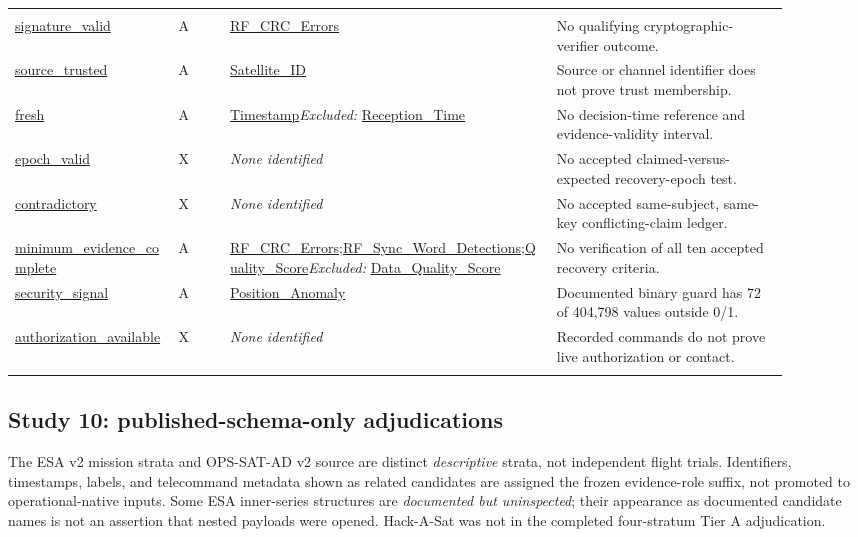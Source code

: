 \begin{longtable}{@{}>{\raggedright\arraybackslash}p{0.19\linewidth}>{\raggedright\arraybackslash}p{0.06\linewidth}>{\raggedright\arraybackslash}p{0.38\linewidth}>{\raggedright\arraybackslash}p{0.27\linewidth}@{}}
\addlinespace[3pt]
\multicolumn{4}{@{}l}{\textbf{UNSW-IoTSAT 2026}}\\
\url{signature_valid} & A & \url{RF_CRC_Errors} & No qualifying cryptographic-verifier outcome. \\
\url{source_trusted} & A & \url{Satellite_ID} & Source or channel identifier does not prove trust membership. \\
\url{fresh} & A & \url{Timestamp}\newline \emph{Excluded:} \url{Reception_Time} & No decision-time reference and evidence-validity interval. \\
\url{epoch_valid} & X & \emph{None identified} & No accepted claimed-versus-expected recovery-epoch test. \\
\url{contradictory} & X & \emph{None identified} & No accepted same-subject, same-key conflicting-claim ledger. \\
\url{minimum_evidence_complete} & A & \url{RF_CRC_Errors};\allowbreak \url{RF_Sync_Word_Detections};\allowbreak \url{Quality_Score}\newline \emph{Excluded:} \url{Data_Quality_Score} & No verification of all ten accepted recovery criteria. \\
\url{security_signal} & A & \url{Position_Anomaly} & Documented binary guard has 72 of 404,798 values outside 0/1. \\
\url{authorization_available} & X & \emph{None identified} & Recorded commands do not prove live authorization or contact. \\
\addlinespace[3pt]
\bottomrule
\end{longtable}
\endgroup

\subsection{Study 10: published-schema-only adjudications}
The ESA v2 mission strata and OPS-SAT-AD v2 source are distinct \emph{descriptive} strata, not independent flight trials. Identifiers, timestamps, labels, and telecommand metadata shown as related candidates are assigned the frozen evidence-role suffix, not promoted to operational-native inputs. Some ESA inner-series structures are \emph{documented but uninspected}; their appearance as documented candidate names is not an assertion that nested payloads were opened. Hack-A-Sat was not in the completed four-stratum Tier A adjudication.

